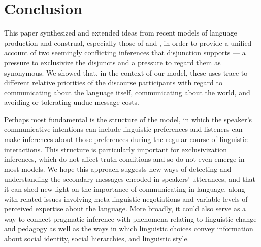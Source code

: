\documentclass{article}
\begin{document}

\section{Conclusion}\label{sec:conclusion}

This paper synthesized and extended ideas from recent models of
language production and construal, especially those of
\citet{Smith:Goodman:Frank:2013} and \citet{bergen-levy-goodman:2014},
in order to provide a unified account of two seemingly conflicting
inferences that disjunction supports --- a pressure to exclusivize the
disjuncts and a pressure to regard them as synonymous. We showed that,
in the context of our model, these uses trace to different relative
priorities of the discourse participants with regard to communicating
about the language itself, communicating about the world, and avoiding
or tolerating undue message costs.


Perhaps most fundamental is the structure of the model, in which the
speaker's communicative intentions can include linguistic preferences
and listeners can make inferences about those preferences during the
regular course of linguistic interactions. This structure is
particularly important for exclusivization inferences, which do not
affect truth conditions and so do not even emerge in most models.  We
hope this approach suggests new ways of detecting and understanding
the secondary messages encoded in speakers' utterances, and that it
can shed new light on the importance of communicating in language,
along with related issues involving meta-linguistic negotiations and
variable levels of perceived expertise about the language. More
broadly, it could also serve as a way to connect pragmatic inference
with phenomena relating to linguistic change and pedagogy as well as
the ways in which linguistic choices convey information about social
identity, social hierarchies, and linguistic style.




\end{document}
